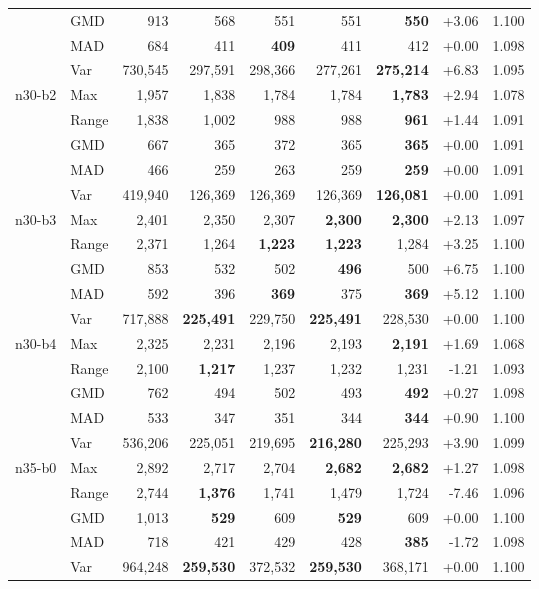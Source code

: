 \begin{small}
\begin{longtable}{llrrrrrrr}
 & GMD & 913 & 568 & 551 & 551 & \textbf{550} & +3.06 & 1.100 \\
 & MAD & 684 & 411 & \textbf{409} & 411 & 412 & +0.00 & 1.098 \\
 & Var & 730,545 & 297,591 & 298,366 & 277,261 & \textbf{275,214} & +6.83 & 1.095 \\
n30-b2 & Max & 1,957 & 1,838 & 1,784 & 1,784 & \textbf{1,783} & +2.94 & 1.078 \\
 & Range & 1,838 & 1,002 & 988 & 988 & \textbf{961} & +1.44 & 1.091 \\
 & GMD & 667 & 365 & 372 & 365 & \textbf{365} & +0.00 & 1.091 \\
 & MAD & 466 & 259 & 263 & 259 & \textbf{259} & +0.00 & 1.091 \\
 & Var & 419,940 & 126,369 & 126,369 & 126,369 & \textbf{126,081} & +0.00 & 1.091 \\
n30-b3 & Max & 2,401 & 2,350 & 2,307 & \textbf{2,300} & \textbf{2,300} & +2.13 & 1.097 \\
 & Range & 2,371 & 1,264 & \textbf{1,223} & \textbf{1,223} & 1,284 & +3.25 & 1.100 \\
 & GMD & 853 & 532 & 502 & \textbf{496} & 500 & +6.75 & 1.100 \\
 & MAD & 592 & 396 & \textbf{369} & 375 & \textbf{369} & +5.12 & 1.100 \\
 & Var & 717,888 & \textbf{225,491} & 229,750 & \textbf{225,491} & 228,530 & +0.00 & 1.100 \\
n30-b4 & Max & 2,325 & 2,231 & 2,196 & 2,193 & \textbf{2,191} & +1.69 & 1.068 \\
 & Range & 2,100 & \textbf{1,217} & 1,237 & 1,232 & 1,231 & -1.21 & 1.093 \\
 & GMD & 762 & 494 & 502 & 493 & \textbf{492} & +0.27 & 1.098 \\
 & MAD & 533 & 347 & 351 & 344 & \textbf{344} & +0.90 & 1.100 \\
 & Var & 536,206 & 225,051 & 219,695 & \textbf{216,280} & 225,293 & +3.90 & 1.099 \\
n35-b0 & Max & 2,892 & 2,717 & 2,704 & \textbf{2,682} & \textbf{2,682} & +1.27 & 1.098 \\
 & Range & 2,744 & \textbf{1,376} & 1,741 & 1,479 & 1,724 & -7.46 & 1.096 \\
 & GMD & 1,013 & \textbf{529} & 609 & \textbf{529} & 609 & +0.00 & 1.100 \\
 & MAD & 718 & 421 & 429 & 428 & \textbf{385} & -1.72 & 1.098 \\
 & Var & 964,248 & \textbf{259,530} & 372,532 & \textbf{259,530} & 368,171 & +0.00 & 1.100 \\

\end{longtable}
\end{small}
